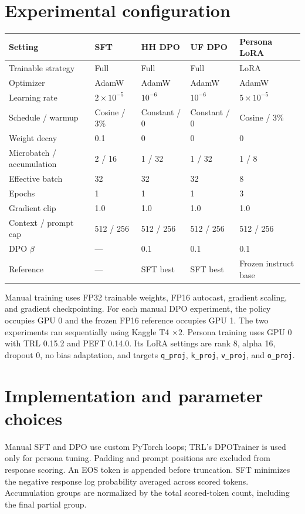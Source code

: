\documentclass[10pt,a4paper]{article}
\begin{document}
\section{Experimental configuration}
\begin{center}\small
\begin{tabularx}{\linewidth}{lXXXX}\toprule
Setting & SFT & HH DPO & UF DPO & Persona LoRA\\\midrule
Trainable strategy & Full & Full & Full & LoRA\\
Optimizer & AdamW & AdamW & AdamW & AdamW\\
Learning rate & $2\times10^{-5}$ & $10^{-6}$ & $10^{-6}$ & $5\times10^{-5}$\\
Schedule / warmup & Cosine / 3\% & Constant / 0 & Constant / 0 & Cosine / 3\%\\
Weight decay & 0.1 & 0 & 0 & 0\\
Microbatch / accumulation & 2 / 16 & 1 / 32 & 1 / 32 & 1 / 8\\
Effective batch & 32 & 32 & 32 & 8\\
Epochs & 1 & 1 & 1 & 3\\
Gradient clip & 1.0 & 1.0 & 1.0 & 1.0\\
Context / prompt cap & 512 / 256 & 512 / 256 & 512 / 256 & 512 / 256\\
DPO $\beta$ & --- & 0.1 & 0.1 & 0.1\\
Reference & --- & SFT best & SFT best & Frozen instruct base\\\bottomrule
\end{tabularx}
\end{center}
Manual training uses FP32 trainable weights, FP16 autocast, gradient scaling, and gradient checkpointing. For each manual DPO experiment, the policy occupies GPU 0 and the frozen FP16 reference occupies GPU 1. The two experiments ran sequentially using Kaggle T4 $\times2$. Persona training uses GPU 0 with TRL 0.15.2 and PEFT 0.14.0. Its LoRA settings are rank 8, alpha 16, dropout 0, no bias adaptation, and targets \texttt{q\_proj}, \texttt{k\_proj}, \texttt{v\_proj}, and \texttt{o\_proj}.

\section{Implementation and parameter choices}
Manual SFT and DPO use custom PyTorch loops; TRL's DPOTrainer is used only for persona tuning. Padding and prompt positions are excluded from response scoring. An EOS token is appended before truncation. SFT minimizes the negative response log probability averaged across scored tokens. Accumulation groups are normalized by the total scored-token count, including the final partial group.
\end{document}
